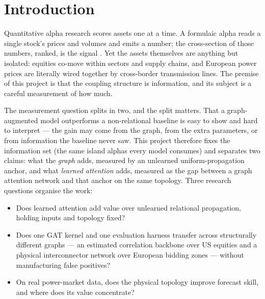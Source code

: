 \chapter{Introduction}
\label{ch:intro}

Quantitative alpha research scores assets one at a time. A formulaic
alpha reads a single stock's prices and volumes and emits a number; the
cross-section of those numbers, ranked, is the signal
\cite{kakushadze2016alphas}. Yet the assets themselves are anything but
isolated: equities co-move within sectors and supply chains, and
European power prices are literally wired together by cross-border
transmission lines. The premise of this project is that the coupling
structure is information, and its subject is a careful measurement of
how much.

The measurement question splits in two, and the split matters. That a
graph-augmented model outperforms a non-relational baseline is easy to
show and hard to interpret --- the gain may come from the graph, from
the extra parameters, or from information the baseline never saw. This
project therefore fixes the information set (the same island alphas
every model consumes) and separates two claims: what the \emph{graph}
adds, measured by an unlearned uniform-propagation anchor, and what
\emph{learned attention} adds, measured as the gap between a graph
attention network \cite{velickovic2018gat} and that anchor on the same
topology. Three research questions organise the work:

\begin{itemize}
  \item[RQ1] Does learned attention add value over unlearned relational
    propagation, holding inputs and topology fixed?
  \item[RQ2] Does one GAT kernel and one evaluation harness transfer
    across structurally different graphs --- an estimated correlation
    backbone over US equities and a physical interconnector network over
    European bidding zones --- without manufacturing false positives?
  \item[RQ3] On real power-market data, does the physical topology
    improve forecast skill, and where does its value concentrate?
\end{itemize}

